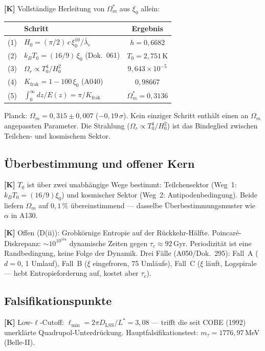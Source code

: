\textbf{[K]} Vollständige Herleitung von $\Omega_m^*$ aus $\xi_0$ allein:
\begin{center}
\small
\begin{tabular}{clc}
\toprule
& Schritt & Ergebnis \\
\midrule
(1) & $H_0 = (\pi/2)\,c\,\xi_0^{10}/\bar\lambda_e$ & $h = 0{,}6682$ \\
(2) & $k_BT_0 = (16/9)\,\xi_0$ (Dok.~061) & $T_0 = 2{,}751$\,K \\
(3) & $\Omega_r \propto T_0^4/H_0^2$ & $9{,}643\times10^{-5}$ \\
(4) & $K_\text{frak} = 1-100\,\xi_0$ (A040) & $0{,}98667$ \\
(5) & $\int_0^\infty dz/E(z) = \pi/K_\text{frak}$ &
  $\boxed{\Omega_m^* = 0{,}3136}$ \\
\bottomrule
\end{tabular}
\end{center}
Planck: $\Omega_m = 0{,}315 \pm 0{,}007$ ($-0{,}19\,\sigma$).
Kein einziger Schritt enthält einen an $\Omega_m$ angepassten Parameter.
Die Strahlung ($\Omega_r \propto T_0^4/H_0^2$) ist das Bindeglied
zwischen Teilchen- und kosmischem Sektor.

\subsection{Überbestimmung und offener Kern}

\textbf{[K]} $T_0$ ist über zwei unabhängige Wege bestimmt:
Teilchensektor (Weg~1: $k_BT_0 = (16/9)\xi_0$) und kosmischer Sektor
(Weg~2: Antipodenbedingung). Beide liefern $\Omega_m$ auf $0{,}1\,\%$
übereinstimmend --- dasselbe Überbestimmungsmuster wie $\alpha$ in A130.

\textbf{[K]} Offen (D(ii)): Grobkörnige Entropie auf der
Rückkehr-Hälfte. Poincaré-Diskrepanz: $\sim 10^{10^{104}}$ dynamische
Zeiten gegen $\tau_c \approx 92$\,Gyr. Periodizität ist eine
Randbedingung, keine Folge der Dynamik. Drei Fälle (A050/Dok.~295):
Fall~A ($d=0$, 1 Umlauf), Fall~B ($\xi$ eingefroren, 75 Umläufe),
Fall~C ($\xi$ läuft, Logspirale --- hebt Entropieforderung auf,
kostet aber $\tau_c$).

\subsection{Falsifikationspunkte}

\textbf{[K]} Low-$\ell$-Cutoff: $\ell_\text{min} = 2\pi D_\text{LSS}/L^* = 3{,}08$
--- trifft die seit COBE (1992) unerklärte Quadrupol-Unterdrückung.
Hauptfalsifikationstest: $m_\tau = 1776{,}97$\,MeV (Belle-II).

